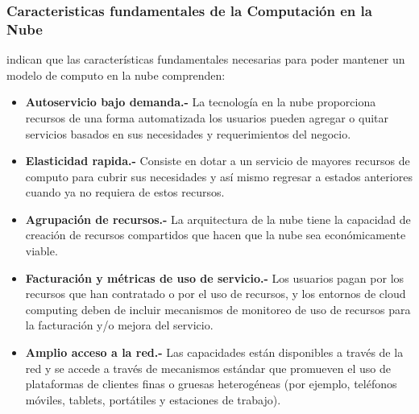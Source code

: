 \subsubsection{Caracteristicas fundamentales de la Computación en la Nube}
\cite{nist} indican que las características fundamentales necesarias para poder
mantener un modelo de computo en la nube comprenden:
\begin{itemize}
    \item \textbf{Autoservicio bajo demanda.-} La tecnología en la nube
          proporciona recursos de una forma automatizada los usuarios pueden
          agregar o quitar servicios basados en sus necesidades y requerimientos
          del negocio.
    \item \textbf{Elasticidad rapida.-} Consiste en dotar a un servicio de mayores
          recursos de computo para cubrir sus necesidades y así mismo regresar
          a estados anteriores cuando ya no requiera de estos recursos.
    \item \textbf{Agrupación de recursos.-} La arquitectura de la nube tiene la capacidad
          de creación de recursos compartidos que hacen que la nube sea
          económicamente viable.
    \item \textbf{Facturación y métricas de uso de servicio.-} Los usuarios
          pagan por los recursos que han contratado o por el uso de recursos, y
          los entornos de cloud computing deben de incluir mecanismos de monitoreo
          de uso de recursos para la facturación y/o mejora del servicio.
    \item \textbf{Amplio acceso a la red.-} Las capacidades están disponibles
          a través de la red y se accede a través de mecanismos estándar
          que promueven el uso de plataformas de clientes finas o gruesas
          heterogéneas (por ejemplo, teléfonos móviles, tablets, portátiles
          y estaciones de trabajo).
\end{itemize}
